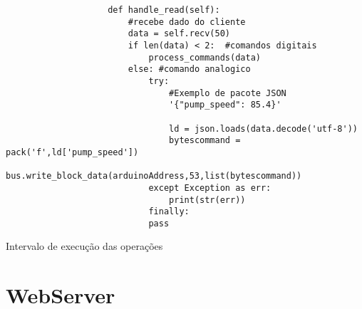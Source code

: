 				\begin{listing}
					\begin{verbatim}
					def handle_read(self):
						#recebe dado do cliente
						data = self.recv(50)
						if len(data) < 2:  #comandos digitais
							process_commands(data)
						else: #comando analogico
							try:
								#Exemplo de pacote JSON
								'{"pump_speed": 85.4}'
								
								ld = json.loads(data.decode('utf-8'))
								bytescommand = pack('f',ld['pump_speed'])
								bus.write_block_data(arduinoAddress,53,list(bytescommand))
							except Exception as err:
								print(str(err))
							finally:
							pass
					\end{verbatim}
					\caption{Intervalo de execução das operações}
					\label{cod:handle_read}
				\end{listing}
			
			\section{WebServer}
				
